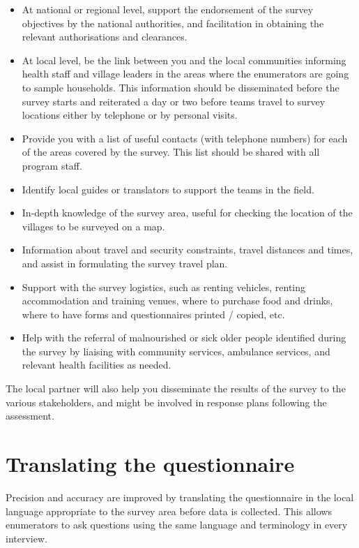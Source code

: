 \documentclass[12pt,a4paper]{book}
\theoremstyle{definition}
\theoremstyle{definition}
\theoremstyle{definition}
\theoremstyle{remark}
\begin{document}
\begin{itemize}
\item
  At national or regional level, support the endorsement of the survey
  objectives by the national authorities, and facilitation in obtaining
  the relevant authorisations and clearances.
\item
  At local level, be the link between you and the local communities
  informing health staff and village leaders in the areas where the
  enumerators are going to sample households. This information should be
  disseminated before the survey starts and reiterated a day or two
  before teams travel to survey locations either by telephone or by
  personal visits.
\item
  Provide you with a list of useful contacts (with telephone numbers)
  for each of the areas covered by the survey. This list should be
  shared with all program staff.
\item
  Identify local guides or translators to support the teams in the
  field.
\item
  In-depth knowledge of the survey area, useful for checking the
  location of the villages to be surveyed on a map.
\item
  Information about travel and security constraints, travel distances
  and times, and assist in formulating the survey travel plan.
\item
  Support with the survey logistics, such as renting vehicles, renting
  accommodation and training venues, where to purchase food and drinks,
  where to have forms and questionnaires printed / copied, etc.
\item
  Help with the referral of malnourished or sick older people identified
  during the survey by liaising with community services, ambulance
  services, and relevant health facilities as needed.
\end{itemize}

The local partner will also help you disseminate the results of the
survey to the various stakeholders, and might be involved in response
plans following the assessment.

\hypertarget{translating-the-questionnaire}{%
\section{Translating the
questionnaire}\label{translating-the-questionnaire}}

Precision and accuracy are improved by translating the questionnaire in
the local language appropriate to the survey area before data is
collected. This allows enumerators to ask questions using the same
language and terminology in every interview.
\end{document}
